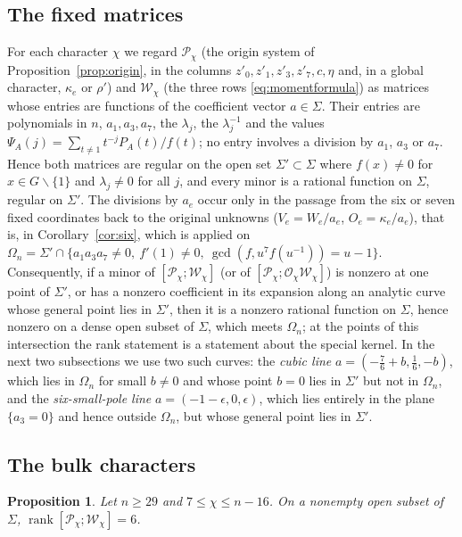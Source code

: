 \documentclass{amsart}
\newtheorem{proposition}[theorem]{Proposition}
\theoremstyle{definition}
\theoremstyle{remark}
\numberwithin{equation}{section}
\DeclareMathOperator{\rank}{rank}
\begin{document}
\subsection{The fixed matrices}\label{sec:fixed}
For each character $\chi$ we regard $\mathcal P_\chi$ (the origin system of
Proposition~\ref{prop:origin}, in the columns $z'_0,z'_1,z'_3,z'_7,c,\eta$ and, in a global
character, $\kappa_e$ or $\rho'$) and $\mathcal W_\chi$ (the three rows
\eqref{eq:momentformula}) as matrices whose entries are functions of the coefficient
vector $a\in\Sigma$. Their entries are polynomials in $n$, $a_1,a_3,a_7$, the $\lambda_j$,
the $\lambda_j^{-1}$ and the values $\Psi_A(j)=\sum_{t\ne1}t^{-j}P_A(t)/f(t)$; no entry
involves a division by $a_1$, $a_3$ or $a_7$. Hence both matrices are regular on the open
set $\Sigma'\subset\Sigma$ where $f(x)\ne0$ for $x\in G\smallsetminus\{1\}$ and
$\lambda_j\ne0$ for all $j$, and every minor is a rational function on $\Sigma$, regular on
$\Sigma'$. The divisions by $a_e$ occur only in the passage from the six or seven fixed
coordinates back to the original unknowns ($V_e=W_e/a_e$, $O_e=\kappa_e/a_e$), that is, in
Corollary~\ref{cor:six}, which is applied on $\Omega_n=\Sigma'\cap\{a_1a_3a_7\ne0,\
f'(1)\ne0,\ \gcd(f,u^7f(u^{-1}))=u-1\}$. Consequently, if a minor of
$[\mathcal P_\chi;\mathcal W_\chi]$ (or of $[\mathcal P_\chi;\mathcal O_\chi\mathcal W_\chi]$)
is nonzero at one point of $\Sigma'$, or has a nonzero coefficient in its expansion along
an analytic curve whose general point lies in $\Sigma'$, then it is a nonzero rational
function on $\Sigma$, hence nonzero on a dense open subset of $\Sigma$, which meets
$\Omega_n$; at the points of this intersection the rank statement is a statement about the
special kernel. In the next two subsections we use two such curves: the \emph{cubic line}
$a=(-\frac76+b,\frac16,-b)$, which lies in $\Omega_n$ for small $b\ne0$ and whose point
$b=0$ lies in $\Sigma'$ but not in $\Omega_n$, and the \emph{six-small-pole line}
$a=(-1-\epsilon,0,\epsilon)$, which lies entirely in the plane $\{a_3=0\}$ and hence
outside $\Omega_n$, but whose general point lies in $\Sigma'$.

\subsection{The bulk characters}
\begin{proposition}\label{prop:bulk}
Let $n\ge29$ and $7\le\chi\le n-16$. On a nonempty open subset of $\Sigma$,
$\rank[\mathcal P_\chi;\mathcal W_\chi]=6$.
\end{proposition}
\end{document}
